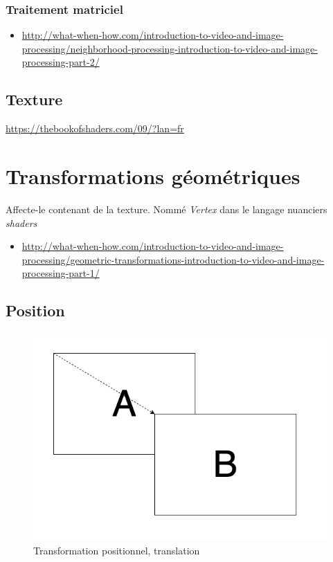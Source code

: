 \documentclass[
  french,
]{book}
\providecommand{\tightlist}{%
  \setlength{\itemsep}{0pt}\setlength{\parskip}{0pt}}
\begin{document}
\hypertarget{traitement-matriciel}{%
\subsubsection{Traitement matriciel}\label{traitement-matriciel}}

\begin{itemize}
\tightlist
\item
  \url{http://what-when-how.com/introduction-to-video-and-image-processing/neighborhood-processing-introduction-to-video-and-image-processing-part-2/}
\end{itemize}

\hypertarget{texture}{%
\subsection{Texture}\label{texture}}

\url{https://thebookofshaders.com/09/?lan=fr}

\hypertarget{transformations-guxe9omuxe9triques}{%
\section{Transformations géométriques}\label{transformations-guxe9omuxe9triques}}

Affecte-le contenant de la texture. Nommé \emph{Vertex} dans le langage nuanciers \emph{shaders}

\begin{itemize}
\tightlist
\item
  \url{http://what-when-how.com/introduction-to-video-and-image-processing/geometric-transformations-introduction-to-video-and-image-processing-part-1/}
\end{itemize}

\hypertarget{position}{%
\subsection{Position}\label{position}}

\begin{figure}
\centering
\includegraphics{medias/traiter/figures/dia_transfogeo_position.png}
\caption{Transformation positionnel, translation}
\end{figure}
\end{document}
